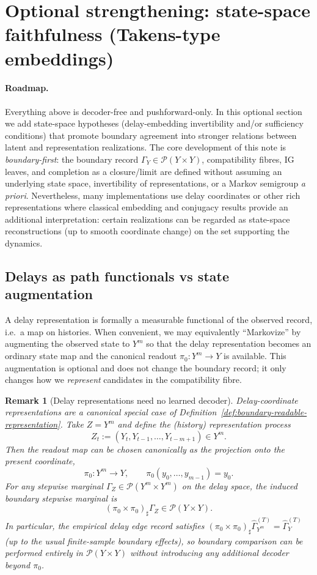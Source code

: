 \documentclass[11pt]{article}
\newtheorem{remark}{Remark}
\newcommand{\Pcal}{\mathcal{P}}
\newcommand{\push}{\sharp}     %
\begin{document}
\section{Optional strengthening: state-space faithfulness (Takens-type embeddings)}
\label{sec:optional-takens}


\paragraph{Roadmap.}
Everything above is decoder-free and pushforward-only.
In this optional section we add state-space hypotheses (delay-embedding invertibility and/or sufficiency conditions) that promote boundary agreement into stronger relations between latent and representation realizations.
\medskip
The core development of this note is \emph{boundary-first}: the boundary record
$\Gamma_Y\in\Pcal(Y\times Y)$, compatibility fibres, IG leaves, and completion as a
closure/limit are defined without assuming an underlying state space, invertibility of representations, or a Markov semigroup \emph{a priori}.
Nevertheless, many implementations use delay coordinates or other rich representations where classical embedding and conjugacy results provide an additional interpretation:
certain realizations can be regarded as state-space reconstructions (up to smooth coordinate change) on the set supporting the dynamics.

\subsection{Delays as path functionals vs state augmentation}
A delay representation is formally a measurable functional of the observed record, i.e.\ a map on histories.
When convenient, we may equivalently ``Markovize'' by augmenting the observed state to $Y^m$ so that the delay representation becomes an ordinary state map and the canonical readout $\pi_0:Y^m\to Y$ is available.
This augmentation is optional and does not change the boundary record; it only changes how we \emph{represent} candidates in the compatibility fibre.



\begin{remark}[Delay representations need no learned decoder]
\label{rem:delay-no-decoder}
Delay-coordinate representations are a canonical special case of
Definition~\ref{def:boundary-readable-representation}.  Take $Z=Y^m$ and
define the (history) representation process
\[
  Z_t := (Y_t,Y_{t-1},\dots,Y_{t-m+1}) \in Y^m.
\]
Then the readout map can be chosen canonically as the projection onto the
present coordinate,
\[
  \pi_0 : Y^m\to Y, \qquad \pi_0(y_0,\dots,y_{m-1}) = y_0.
\]
For any stepwise marginal $\Gamma_Z\in\Pcal(Y^m\times Y^m)$ on the delay space,
the induced boundary stepwise marginal is
\[
  (\pi_0\times \pi_0)_{\push}\Gamma_Z \in \Pcal(Y\times Y).
\]
In particular, the empirical delay edge record satisfies
$(\pi_0\times \pi_0)_{\push}\widehat\Gamma_{Y^m}^{(T)}=\widehat\Gamma_Y^{(T)}$
(up to the usual finite-sample boundary effects), so boundary comparison can be
performed entirely in $\Pcal(Y\times Y)$ without introducing any additional
decoder beyond $\pi_0$.
\end{remark}
\end{document}
